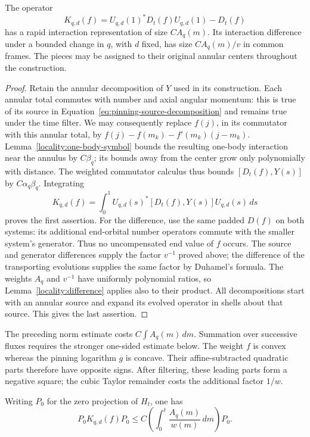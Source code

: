 \begin{proposition}
\label{pinning:weighted-transport}
The operator
\[
 K_{q,d}(f)=U_{q,d}(1)^*D_t(f)U_{q,d}(1)-D_t(f)
\]
has a rapid interaction representation of size $CA_q(m)$.  Its
interaction difference under a bounded change in $q$, with $d$ fixed,
has size $CA_q(m)/v$ in common frames.  The pieces may be assigned to
their original annular centers throughout the construction.
\end{proposition}

\begin{proof}
Retain the annular decomposition of $Y$ used in its construction.
Each annular total commutes with number and axial angular momentum:
this is true of its source in Equation~\eqref{eq:pinning-source-decomposition}
and remains true under the time filter.  We may consequently replace
$f(j)$, in its commutator with this annular total, by
$f(j)-f(m_k)-f'(m_k)(j-m_k)$.  Lemma~\ref{locality:one-body-symbol}
bounds the resulting one-body interaction near the annulus by $C\beta_q$;
its bounds away from the center grow only polynomially with distance.
The weighted commutator calculus thus bounds $[D_t(f),Y(s)]$ by
$C\alpha_q\beta_q$.  Integrating
\[
 K_{q,d}(f)=\int_0^1 U_{q,d}(s)^*[D_t(f),Y(s)]U_{q,d}(s)\,ds
\]
proves the first assertion.  For the difference, use the same padded
$D(f)$ on both systems: its additional end-orbital number operators
commute with the smaller system's generator.  Thus no uncompensated
end value of $f$ occurs.  The source and generator
differences supply the factor $v^{-1}$ proved above; the difference of
the transporting evolutions supplies the same factor by Duhamel's
formula.  The weights $A_q$ and $v^{-1}$ have uniformly polynomial
ratios, so Lemma~\ref{locality:difference} applies also to their product.
All decompositions start with an annular source and expand its evolved
operator in shells about that source.  This gives the last assertion.
\end{proof}

The preceding norm estimate costs $C\int A_q(m)\,dm$.  Summation over
successive fluxes requires the stronger one-sided estimate below.
The weight $f$ is convex whereas the pinning logarithm $g$ is concave.
Their affine-subtracted quadratic parts therefore have opposite signs.
After filtering, these leading parts form a negative square; the cubic
Taylor remainder costs the additional factor $1/w$.

\begin{proposition}
\label{pinning:one-sided}
Writing $P_0$ for the zero projection of $H_t$, one has
\begin{equation}
 P_0K_{q,d}(f)P_0
 \le C\left(\int_0^t\frac{A_q(m)}{w(m)}\,dm\right)P_0.
 \label{eq:pinning-one-sided}
\end{equation}
\end{proposition}

